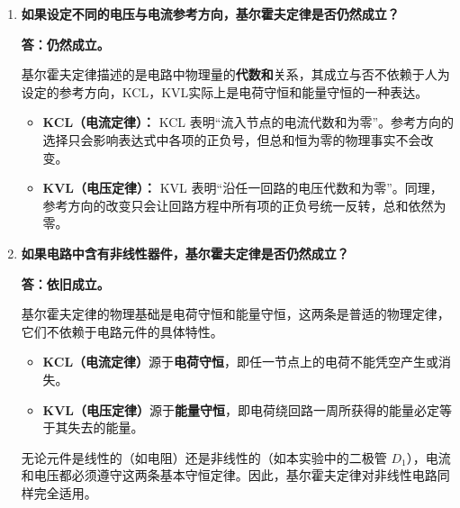 \documentclass{Report} %
\begin{document}
\begin{enumerate}

    \item \textbf{如果设定不同的电压与电流参考方向，基尔霍夫定律是否仍然成立？}

    \textbf{答：仍然成立。}

    基尔霍夫定律描述的是电路中物理量的\textbf{代数和}关系，其成立与否不依赖于人为设定的参考方向，KCL，KVL实际上是电荷守恒和能量守恒的一种表达。

    \begin{itemize}
        \item \textbf{KCL（电流定律）：} KCL 表明“流入节点的电流代数和为零”。参考方向的选择只会影响表达式中各项的正负号，但总和恒为零的物理事实不会改变。
        \item \textbf{KVL（电压定律）：} KVL 表明“沿任一回路的电压代数和为零”。同理，参考方向的改变只会让回路方程中所有项的正负号统一反转，总和依然为零。
    \end{itemize}

    \item \textbf{如果电路中含有非线性器件，基尔霍夫定律是否仍然成立？}

    \textbf{答：依旧成立。}

    基尔霍夫定律的物理基础是电荷守恒和能量守恒，这两条是普适的物理定律，它们不依赖于电路元件的具体特性。

    \begin{itemize}
        \item \textbf{KCL（电流定律）}源于\textbf{电荷守恒}，即任一节点上的电荷不能凭空产生或消失。
        \item \textbf{KVL（电压定律）}源于\textbf{能量守恒}，即电荷绕回路一周所获得的能量必定等于其失去的能量。
    \end{itemize}

    无论元件是线性的（如电阻）还是非线性的（如本实验中的二极管 $D_1$），电流和电压都必须遵守这两条基本守恒定律。因此，基尔霍夫定律对非线性电路同样完全适用。

\end{enumerate}
\end{document}

